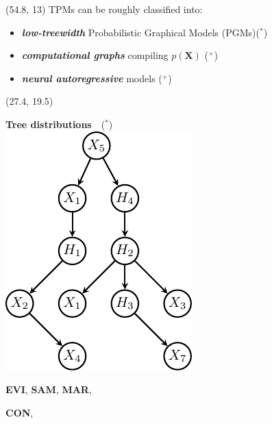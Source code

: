 \documentclass[final]{beamer}
\newcommand{\cmark}{\ding{51}}%
\begin{document}
\begin{frame}{}
  \begin{textblock}{25.2}(54.8, 13)
    \small
    TPMs can be roughly classified into:
    \begin{itemize}
    \item \textbf{\emph{low-treewidth}} Probabilistic Graphical Models
      (PGMs)($^*$)
    \item \textbf{\emph{computational graphs}} compiling
      $p(\mathbf{X})$ ($^\times$)
    \item \textbf{\emph{neural autoregressive}} models ($^+$) 
    \end{itemize}
     
  \end{textblock}

  \begin{textblock}{52.5}(27.4, 19.5)
    \small
    \begin{minipage}[t]{0.19\linewidth}
      \begin{center}
        \textbf{Tree distributions}~\parencite{Meila2000}~($^*$)\\[20pt]
        \includegraphics[width=0.65\linewidth]{figures/tree}\vspace{-5pt}
        \begin{minipage}[t]{0.58\linewidth}
          \scriptsize \flushleft 
          \textcolor{tractable_green}{\cmark \textbf{EVI}}, \textcolor{tractable_green}{\cmark \textbf{SAM}},
          \textcolor{tractable_green}{\cmark \textbf{MAR}},\par
          \textcolor{tractable_green}{\cmark \textbf{CON}},

\end{minipage}
\end{center}
\end{minipage}
\end{textblock}
\end{frame}
\end{document}
